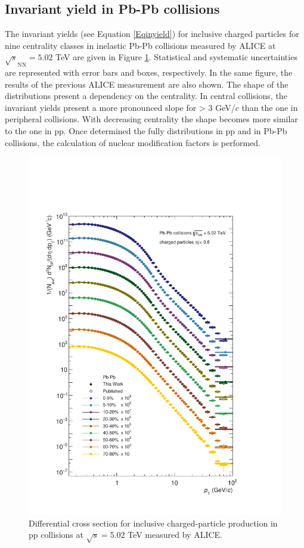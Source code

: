 \documentclass[12pt,a4paper]{report}
\begin{document}
\subsection{Invariant yield in Pb-Pb collisions}
The invariant yields (see Equation \ref{Eqinyield}) for inclusive charged particles for nine centrality classes in inelastic Pb-Pb collisions measured by ALICE at $\sqrt{s}_\text{NN}=5.02$ TeV are given in Figure \ref{invYield}. Statistical and systematic uncertainties are represented with error bars and boxes, respectively. In the same figure, the results of the previous ALICE measurement are also shown. The shape of the \pt distributions present a dependency on the centrality. In central collisions, the invariant yields present a more pronounced slope for \pt > 3 GeV/$c$ than the one in peripheral collisions. With decreasing centrality the shape becomes more similar to the one in pp. Once determined the fully \pt distributions in pp and in Pb-Pb collisions, the calculation of nuclear modification factors is performed.
\begin{figure}[tb!]
\centering
\includegraphics[width=12cm]{Plots/invYieldPbPb.pdf}  
\caption{Differential cross section for inclusive charged-particle production in pp collisions at $\sqrt{s}=5.02$ TeV measured by ALICE.}
\label{invYield}
\end{figure}
\end{document}
